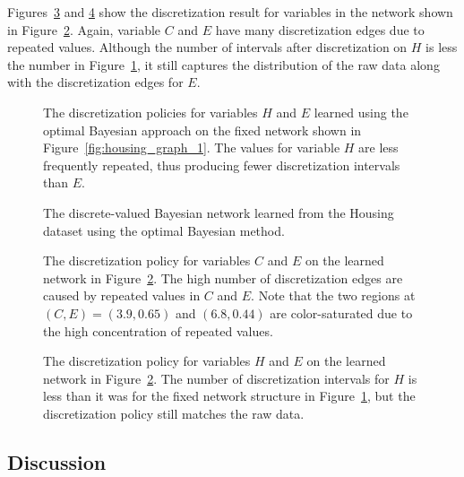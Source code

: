 Figures~\ref{fig:housing_exp2_distr_3_5} and \ref{fig:housing_exp2_distr_8_5} show the discretization result for variables in the network shown in Figure~\ref{fig:housing_graph_2}.
Again, variable $C$ and $E$ have many discretization edges due to repeated values.
Although the number of intervals after discretization on $H$ is less the number in Figure~\ref{fig:housing_exp1_distr_8_5}, it still captures the distribution of the raw data along with the discretization edges for $E$.

\begin{figure}[H]
  \centering
  
  \caption{
    The discretization policies for variables $H$ and $E$ learned using the optimal Bayesian approach on the fixed network shown in Figure~\ref{fig:housing_graph_1}.
    The values for variable $H$ are less frequently repeated, thus producing fewer discretization intervals than $E$.
  }
  \label{fig:housing_exp1_distr_8_5}
\end{figure}

\begin{figure}[H]
  \centering
  \scalebox{0.8}{}
  \caption{
    The discrete-valued Bayesian network learned from the Housing dataset using the optimal Bayesian method.
  }
  \label{fig:housing_graph_2}
\end{figure}

\begin{figure}[H]
  \centering
  
  \caption{
    The discretization policy for variables $C$ and $E$ on the learned network in Figure~\ref{fig:housing_graph_2}.
    The high number of discretization edges are caused by repeated values in $C$ and $E$.
    Note that the two regions at $(C,E) = (3.9,0.65)$ and $(6.8,0.44)$ are color-saturated due to the high concentration of repeated values.
  }
  \label{fig:housing_exp2_distr_3_5}
\end{figure}

\begin{figure}[H]
  \centering
  
  \caption{
    The discretization policy for variables $H$ and $E$ on the learned network in Figure~\ref{fig:housing_graph_2}.
    The number of discretization intervals for $H$ is less than it was for the fixed network structure in Figure~\ref{fig:housing_exp1_distr_8_5}, but the discretization policy still matches the raw data.
  }
  \label{fig:housing_exp2_distr_8_5}
\end{figure}

\subsection{Discussion}
\label{subsec:discuss_exp}

